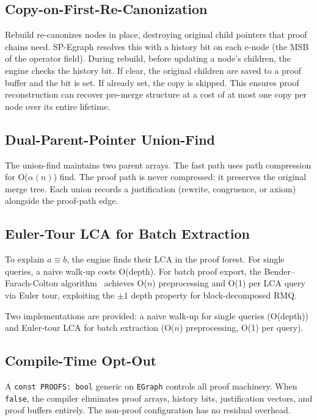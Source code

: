 \documentclass[sigplan,nonacm]{acmart}
\begin{document}
\subsection{Copy-on-First-Re-Canonization}

Rebuild re-canonizes nodes in place, destroying original child
pointers that proof chains need.  SP-Egraph resolves this with a
history bit on each e-node (the MSB of the operator field).  During
rebuild, before updating a node's children, the engine checks the
history bit.  If clear, the original children are saved to a proof
buffer and the bit is set.  If already set, the copy is skipped.
This ensures proof reconstruction can recover pre-merge structure at
a cost of at most one copy per node over its entire lifetime.

\subsection{Dual-Parent-Pointer Union-Find}

The union-find maintains two parent arrays.  The fast path uses path
compression for O($\alpha(n)$) find.  The proof path is never
compressed: it preserves the original merge tree.  Each union records
a justification (rewrite, congruence, or axiom) alongside the
proof-path edge.

\subsection{Euler-Tour LCA for Batch Extraction}

To explain $a \equiv b$, the engine finds their LCA in the proof
forest.  For single queries, a naive walk-up costs O(depth).  For
batch proof export, the Bender--Farach-Colton
algorithm~\cite{bfc} achieves O($n$) preprocessing and O(1) per
LCA query via Euler tour, exploiting the $\pm 1$ depth property for
block-decomposed RMQ.

Two implementations are provided: a naive walk-up for single queries
(O(depth)) and Euler-tour LCA for batch extraction (O($n$)
preprocessing, O(1) per query).

\subsection{Compile-Time Opt-Out}

A \texttt{const PROOFS: bool} generic on \texttt{EGraph} controls
all proof machinery.  When \texttt{false}, the compiler eliminates
proof arrays, history bits, justification vectors, and proof buffers
entirely.  The non-proof configuration has no residual overhead.
\end{document}
